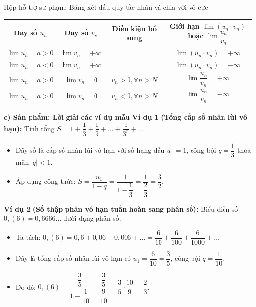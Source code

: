 \documentclass[12pt, a4paper]{article}
\begin{document}
\begin{scaffoldbox}{Hộp hỗ trợ sư phạm: Bảng xét dấu quy tắc nhân và chia với vô cực}
\small
\begin{tabularx}{\textwidth}{|c|c|c|c|}
\hline
\textbf{Dãy số $u_n$} & \textbf{Dãy số $v_n$} & \textbf{Điều kiện bổ sung} & \textbf{Giới hạn $\lim (u_n \cdot v_n)$ hoặc $\lim \dfrac{u_n}{v_n}$} \\ \hline
$\lim u_n = a > 0$ & $\lim v_n = +\infty$ & & $\lim (u_n \cdot v_n) = +\infty$ \\ \hline
$\lim u_n = a < 0$ & $\lim v_n = +\infty$ & & $\lim (u_n \cdot v_n) = -\infty$ \\ \hline
$\lim u_n = a > 0$ & $\lim v_n = 0$ & $v_n > 0, \forall n > N$ & $\lim \dfrac{u_n}{v_n} = +\infty$ \\ \hline
$\lim u_n = a > 0$ & $\lim v_n = 0$ & $v_n < 0, \forall n > N$ & $\lim \dfrac{u_n}{v_n} = -\infty$ \\ \hline
\end{tabularx}
\end{scaffoldbox}

\noindent \textbf{c) Sản phẩm: Lời giải các ví dụ mẫu}
\textbf{Ví dụ 1 (Tổng cấp số nhân lùi vô hạn):} Tính tổng $S = 1 + \dfrac{1}{3} + \dfrac{1}{9} + \dots + \dfrac{1}{3^n} + \dots$
\begin{itemize}[leftmargin=0.6cm]
    \item Dãy số là cấp số nhân lùi vô hạn với số hạng đầu $u_1 = 1$, công bội $q = \dfrac{1}{3}$ thỏa mãn $|q| < 1$.
    \item Áp dụng công thức: $S = \dfrac{u_1}{1 - q} = \dfrac{1}{1 - \dfrac{1}{3}} = \dfrac{1}{\dfrac{2}{3}} = \dfrac{3}{2}$.
\end{itemize}

\textbf{Ví dụ 2 (Số thập phân vô hạn tuần hoàn sang phân số):} Biểu diễn số $0{,}(6) = 0{,}6666\dots$ dưới dạng phân số.
\begin{itemize}[leftmargin=0.6cm]
    \item Ta tách: $0{,}(6) = 0{,}6 + 0{,}06 + 0{,}006 + \dots = \dfrac{6}{10} + \dfrac{6}{100} + \dfrac{6}{1000} + \dots$
    \item Đây là tổng cấp số nhân lùi vô hạn có $u_1 = \dfrac{6}{10} = \dfrac{3}{5}$, công bội $q = \dfrac{1}{10}$.
    \item Do đó: $0{,}(6) = \dfrac{\dfrac{3}{5}}{1 - \dfrac{1}{10}} = \dfrac{\dfrac{3}{5}}{\dfrac{9}{10}} = \dfrac{3}{5} \cdot \dfrac{10}{9} = \dfrac{2}{3}$.
\end{itemize}
\end{document}
